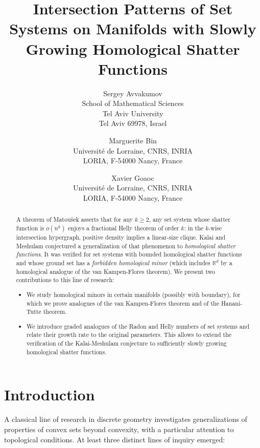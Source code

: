 \documentclass[a4paper,UKenglish,thm-restate]{article}
\title{Intersection Patterns of Set Systems on Manifolds with Slowly Growing Homological Shatter Functions}
\author{
  Sergey Avvakumov\\
  School of Mathematical Sciences\\
  Tel Aviv University\\
  Tel Aviv 69978, Israel\\
  \and 
  Marguerite Bin\\
  Universit\'e de Lorraine, CNRS, INRIA\\
  LORIA,  F-54000 Nancy, France\\
  \and
  Xavier Goaoc\\
  Universit\'e de Lorraine, CNRS, INRIA\\
  LORIA,  F-54000 Nancy, France\\
  }
\newcommand{\R}{\mathbb{R}}
\begin{document}
\maketitle

\begin{abstract}
  A theorem of Matou\v sek asserts that for any $k \ge 2$, any set system whose shatter function is $o(n^k)$ enjoys a fractional Helly theorem of order $k$: in the $k$-wise intersection hypergraph, positive density implies a linear-size clique. Kalai and Meshulam conjectured a generalization of that phenomenon to \emph{homological shatter functions}. It was verified for set systems with bounded homological shatter functions and whose ground set has a \emph{forbidden homological minor} (which includes $\R^d$ by a homological analogue of the van Kampen-Flores theorem). We present two contributions to this line of research:

  \begin{itemize}
  \item We study homological minors in certain manifolds (possibly with boundary), for which we prove analogues of the van Kampen-Flores theorem and of the Hanani-Tutte theorem.\medskip
  \item We introduce graded analogues of the Radon and Helly numbers of set systems and relate their growth rate to the original parameters. This allows to extend the verification of the Kalai-Meshulam conjecture to sufficiently slowly growing homological shatter functions.
  \end{itemize}
\end{abstract}


\section{Introduction}

A classical line of research in discrete geometry investigates generalizations of properties of convex sets beyond convexity, with a particular attention to topological conditions. At least three distinct lines of inquiry emerged:
\end{document}
